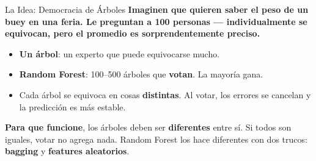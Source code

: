 \documentclass[aspectratio=169, 11pt]{beamer}
\begin{document}
\begin{frame}{La Idea: Democracia de Árboles}
  \vspace{-4pt}
  {\footnotesize\color{arcaDark}\bfseries
    Imaginen que quieren saber el peso de un buey en una feria.
    Le preguntan a 100 personas --- individualmente se equivocan,
    pero el \textbf{promedio} es sorprendentemente preciso.}

  \vspace{8pt}
  {\footnotesize
  \begin{itemize}\setlength{\itemsep}{5pt}
    \item[{\color{arcaRed}\scriptsize\faArrowRight}]
      \textbf{Un árbol}: un experto que puede equivocarse mucho.
    \item[{\color{codeGreen}\scriptsize\faArrowRight}]
      \textbf{Random Forest}: 100--500 árboles que \textbf{votan}.
      La mayoría gana.
    \item[{\color{codeGreen}\scriptsize\faArrowRight}]
      Cada árbol se equivoca en cosas \textbf{distintas}. Al votar,
      los errores se cancelan y la predicción es más estable.
  \end{itemize}
  }

  \vspace{6pt}
  \begin{tcolorbox}[colback=arcaGray, colframe=arcaRed, boxrule=0.5pt, arc=2pt,
    left=6pt, right=6pt, top=4pt, bottom=4pt]
    {\scriptsize\color{arcaDark}
    \faKey\hspace{4pt}\textbf{Para que funcione}, los árboles deben ser
    \textbf{diferentes} entre sí. Si todos son iguales, votar no agrega
    nada. Random Forest los hace diferentes con dos trucos: \textbf{bagging}
    y \textbf{features aleatorios}.}
  \end{tcolorbox}
\end{frame}
\end{document}
